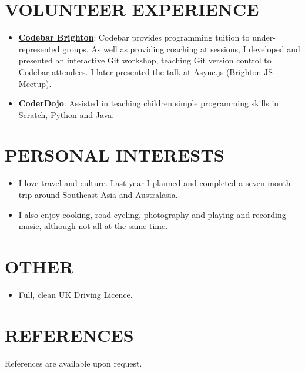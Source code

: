 \documentclass{article}
\begin{document}
 \section*{VOLUNTEER EXPERIENCE}
  \vspace{1em}
  \begin{itemize}
    \item \href{https://codebar.io/brighton}{\textbf{Codebar Brighton}}: Codebar provides programming tuition to under-represented groups. As well as providing coaching at sessions, I developed and presented an interactive Git workshop, teaching Git version control to Codebar attendees. I later presented the talk at Async.js (Brighton JS Meetup).
    \item \href{https://www.coderdojobrighton.co.uk}{\textbf{CoderDojo}}: Assisted in teaching children simple programming skills in Scratch, Python and Java.
  \end{itemize}
  \vspace{1em}

 \section*{PERSONAL INTERESTS}
  \vspace{1em}
  \begin{itemize}
    \item I love travel and culture. Last year I planned and completed a seven month trip around Southeast Asia and Australasia.
    \item I also enjoy cooking, road cycling, photography and playing and recording music, although not all at the same time.
  \end{itemize}
  \vspace{1em}

 \section*{OTHER}
  \vspace{1em}
  \begin{itemize}
    \item Full, clean UK Driving Licence.
  \end{itemize}
  \vspace{1em}

  \section*{REFERENCES}
    \vspace{1em}
    References are available upon request.
\end{document}
